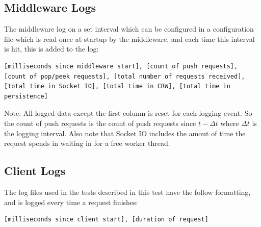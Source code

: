 \documentclass{article}
\begin{document}
            \subsection{Middleware Logs}
            The middleware log on a set interval which can be configured in a configuration file which is read once at startup by the middleware, and each time this interval is hit, this is added to the log:
            \begin{lstlisting}[breaklines]
            [milliseconds since middleware start], [count of push requests], [count of pop/peek requests], [total number of requests received], [total time in Socket IO], [total time in CRW], [total time in persistence]
            \end{lstlisting}
            Note: All logged data except the first column is reset for each logging event. So the count of push requests is the count of push requests since $t-\Delta t$ where $\Delta t$ is the logging interval. Also note that Socket IO includes the amout of time the request spends in waiting in for a free worker thread.


            \subsection{Client Logs}
            The log files used in the tests described in this test have the follow formatting, and is logged every time a request finishes:
            \begin{lstlisting}[breaklines]
            [milliseconds since client start], [duration of request]
            \end{lstlisting}
\end{document}
